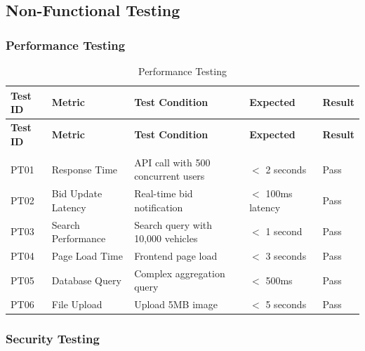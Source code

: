 \subsection{Non-Functional Testing}

\subsubsection{Performance Testing}

\begin{longtable}{|p{2cm}|p{3cm}|p{3.5cm}|p{1.8cm}|p{0.8cm}|}
    \hline
    \textbf{Test ID} & \textbf{Metric} & \textbf{Test Condition} & \textbf{Expected} & \textbf{Result} \\
    \hline
    \endfirsthead

    \hline
    \textbf{Test ID} & \textbf{Metric} & \textbf{Test Condition} & \textbf{Expected} & \textbf{Result} \\
    \hline
    \endhead

    \hline
    \endfoot

    \hline
    \caption{Performance Testing} \label{tab:performance_tests} \\
    \endlastfoot

    PT01 & Response Time & API call with 500 concurrent users & $<$ 2 seconds & Pass \\
    \hline
    PT02 & Bid Update Latency & Real-time bid notification & $<$ 100ms latency & Pass \\
    \hline
    PT03 & Search Performance & Search query with 10,000 vehicles & $<$ 1 second & Pass \\
    \hline
    PT04 & Page Load Time & Frontend page load & $<$ 3 seconds & Pass \\
    \hline
    PT05 & Database Query & Complex aggregation query & $<$ 500ms & Pass \\
    \hline
    PT06 & File Upload & Upload 5MB image & $<$ 5 seconds & Pass \\
\end{longtable}

\subsubsection{Security Testing}

